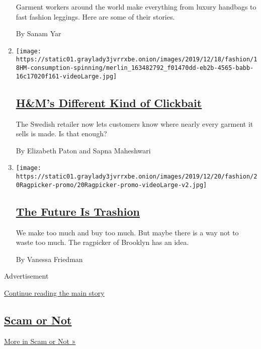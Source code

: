 \begin{enumerate}
  Garment workers around the world make everything from luxury handbags
  to fast fashion leggings. Here are some of their stories.

  By Sanam Yar
\item
  \texttt{[image: https://static01.graylady3jvrrxbe.onion/images/2019/12/18/fashion/18HM-consumption-spinning/merlin\_163482792\_f01470dd-eb2b-4565-babb-16c17020f161-videoLarge.jpg]}

  \hypertarget{hms-different-kind-of-clickbait}{%
  \subsection{\texorpdfstring{\href{/2019/12/18/fashion/hms-supply-chain-transparency.html}{H\&M's
  Different Kind of
  Clickbait}}{H\&M's Different Kind of Clickbait}}\label{hms-different-kind-of-clickbait}}

  The Swedish retailer now lets customers know where nearly every
  garment it sells is made. Is that enough?

  By Elizabeth Paton and Sapna Maheshwari
\item
  \texttt{[image: https://static01.graylady3jvrrxbe.onion/images/2019/12/20/fashion/20Ragpicker-promo/20Ragpicker-promo-videoLarge-v2.jpg]}

  \hypertarget{the-future-is-trashion}{%
  \subsection{\texorpdfstring{\href{/2019/12/20/style/zero-waste-daniel-trashion.html}{The
  Future Is
  Trashion}}{The Future Is Trashion}}\label{the-future-is-trashion}}

  We make too much and buy too much. But maybe there is a way not to
  waste too much. The ragpicker of Brooklyn has an idea.

  By Vanessa Friedman
\end{enumerate}

Advertisement

\protect\hyperlink{after-mid3}{Continue reading the main story}

\hypertarget{scam-or-not}{%
\subsection{\texorpdfstring{\href{/column/scam-or-not}{Scam or
Not}}{Scam or Not}}\label{scam-or-not}}

\href{/column/scam-or-not}{More in Scam or Not »}

